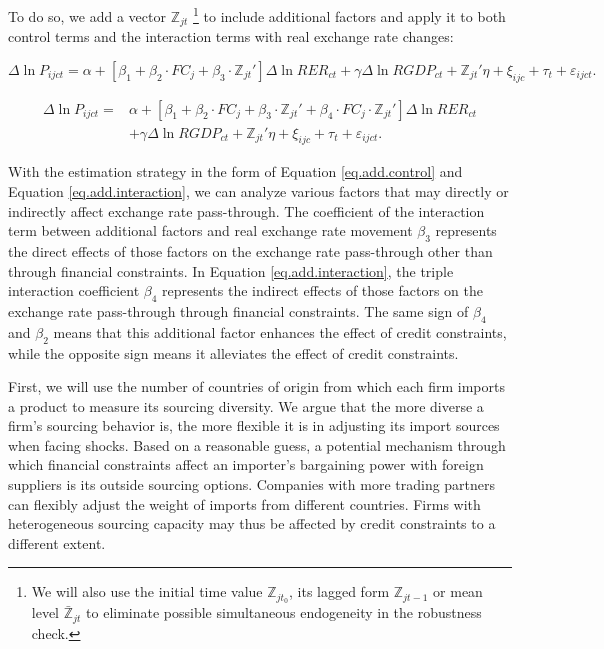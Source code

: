 \documentclass[12pt]{article}
\begin{document}
To do so, we add a vector $\mathbb{Z}_{jt}$ \footnote{We will also use the initial time value $\mathbb{Z}_{jt_0}$, its lagged form $\mathbb{Z}_{jt-1}$ or mean level $\bar{\mathbb{Z}}_{jt}$ to eliminate possible simultaneous endogeneity in the robustness check.} to include additional factors and apply it to both control terms and the interaction terms with real exchange rate changes: 

\begin{equation}
	\Delta \ln P_{ijct}=\alpha+[\beta_{1}+ \beta_{2} \cdot FC_{j}+\beta_{3} \cdot {\mathbb{Z}_{jt}}'] \Delta \ln RER_{ct} +\gamma \Delta \ln RGDP_{ct}+ {\mathbb{Z}_{jt}}' \eta+\xi_{ijc}+\tau_{t} +\varepsilon_{ijct}.
	\label{eq.add.control}
\end{equation}

\begin{equation}
	\begin{aligned}
	\Delta \ln P_{ijct}=&\alpha+[\beta_{1}+ \beta_{2} \cdot FC_{j}+\beta_{3} \cdot {\mathbb{Z}_{jt}}'+\beta_{4} \cdot FC_{j} \cdot {\mathbb{Z}_{jt}}'] \Delta \ln RER_{ct} \\ &+\gamma \Delta \ln RGDP_{ct}+ {\mathbb{Z}_{jt}}' \eta+\xi_{ijc}+\tau_{t} +\varepsilon_{ijct}.
	\end{aligned}	
	\label{eq.add.interaction}
\end{equation}

With the estimation strategy in the form of Equation \ref{eq.add.control} and Equation \ref{eq.add.interaction}, we can analyze various factors that may directly or indirectly affect exchange rate pass-through. The coefficient of the interaction term between additional factors and real exchange rate movement $\beta_3$ represents the direct effects of those factors on the exchange rate pass-through other than through financial constraints. In Equation \ref{eq.add.interaction}, the triple interaction coefficient $\beta_4$ represents the indirect effects of those factors on the exchange rate pass-through through financial constraints. The same sign of $\beta_4$ and $\beta_2$ means that this additional factor enhances the effect of credit constraints, while the opposite sign means it alleviates the effect of credit constraints. 

First, we will use the number of countries of origin from which each firm imports a product to measure its sourcing diversity. We argue that the more diverse a firm's sourcing behavior is, the more flexible it is in adjusting its import sources when facing shocks. Based on a reasonable guess, a potential mechanism through which financial constraints affect an importer's bargaining power with foreign suppliers is its outside sourcing options. Companies with more trading partners can flexibly adjust the weight of imports from different countries. Firms with heterogeneous sourcing capacity may thus be affected by credit constraints to a different extent. 
\end{document}
